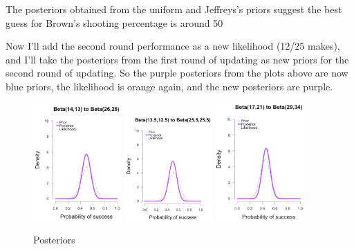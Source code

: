 The posteriors obtained from the uniform and Jeffreys's priors suggest the best guess for Brown's shooting percentage is around 50%

Now I'll add the second round performance as a new likelihood (12/25 makes), and I'll take the posteriors from the first round of updating as new priors for the second round of updating. So the purple posteriors from the plots above are now blue priors, the likelihood is orange again, and the new posteriors are purple.


\begin{figure}[h]
    \centering
\includegraphics[width=0.3\textwidth]{pic/p05c03-snip08-1.png}
\includegraphics[width=0.3\textwidth]{pic/p05c03-snip08-2.png}
\includegraphics[width=0.3\textwidth]{pic/p05c03-snip08-3.png}
    \caption{Posteriors}
    \label{fig:p05c03-snip08}
\end{figure}


